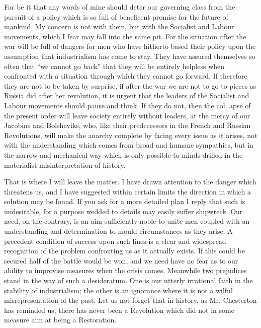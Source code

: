\documentclass{book}
\begin{document}
Far be it that any words of mine should deter our governing class from the pursuit of a policy which is so full of beneficent promise for the future of mankind. My concern is not with them, but with the Socialist and Labour movements, which I fear may fall into the same pit. For the situation after the war will be full of dangers for men who have hitherto based their policy upon the assumption that industrialism has come to stay. They have assured themselves so often that “we cannot go back” that they will be entirely helpless when confronted with a situation through which they cannot go forward. If therefore they are not to be taken by surprise, if after the war we are not to go to pieces as Russia did after her revolution, it is urgent that the leaders of the Socialist and Labour movements should pause and think. If they do not, then the col{]} apse of the present order will leave society entirely without leaders, at the mercy of our Jacobins and Bolsheviks, who, like their predecessors in the French and Russian Revolutions, will make the anarchy complete by facing every issue as it arises, not with the understanding which comes from broad and humane sympathies, but in the narrow and mechanical way which is only possible to minds drilled in the materialist misinterpretation of history.

That is where I will leave the matter. I have drawn attention to the danger which threatens us, and I have suggested within certain limits the direction in which a solution may be found. If you ask for a more detailed plan I reply that such is undesirable, for a purpose wedded to details may easily suffer shipwreck. Our need, on the contrary, is an aim sufficiently noble to unite men coupled with an understanding and determination to mould circumstances as they arise. A precedent condition of success upon such lines is a clear and widespread recognition of the problem confronting us as it actually exists. If this could be secured half of the battle would be won, and we need have no fear as to our ability to improvise measures when the crisis comes. Meanwhile two prejudices stand in the way of such a desideratum. One is our utterly irrational faith in the stability of industrialism; the other is an ignorance where it is not a wilful misrepresentation of the past. Let us not forget that in history, as Mr. Chesterton has reminded us, there has never been a Revolution which did not in some measure aim at being a Restoration.

\end{document}
